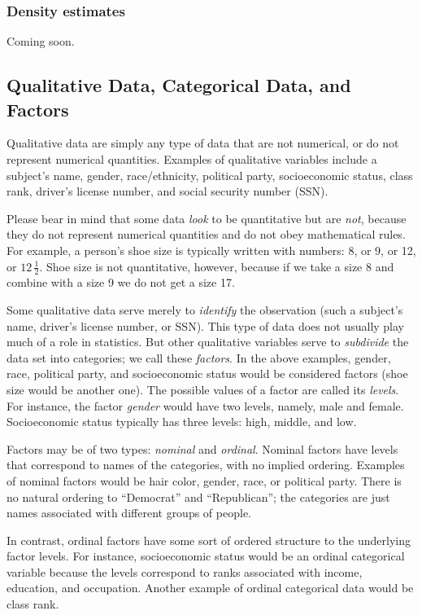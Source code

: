 \documentclass[captions=tableheading]{scrbook}
\begin{document}
\subsubsection{Density estimates}
\label{sec-2-1-2-5}


Coming soon.
\subsection{Qualitative Data, Categorical Data, and Factors}
\label{sec-2-1-3}
\label{sub:Qualitative-Data}


Qualitative data are simply any type of data that are not numerical, or do not represent numerical quantities. Examples of qualitative variables include a subject's name, gender, race/ethnicity, political party, socioeconomic status, class rank, driver's license number, and social security number (SSN).

Please bear in mind that some data \emph{look} to be quantitative but are \emph{not}, because they do not represent numerical quantities and do not obey mathematical rules. For example, a person's shoe size is typically written with numbers: 8, or 9, or 12, or \(12\,\frac{1}{2}\). Shoe size is not quantitative, however, because if we take a size 8 and combine with a size 9 we do not get a size 17.

Some qualitative data serve merely to \emph{identify} the observation (such a subject's name, driver's license number, or SSN). This type of data does not usually play much of a role in statistics. But other qualitative variables serve to \emph{subdivide} the data set into categories; we call these \emph{factors}. In the above examples, gender, race, political party, and socioeconomic status would be considered factors (shoe size would be another one). The possible values of a factor are called its \emph{levels}. For instance, the factor \emph{gender} would have two levels, namely, male and female. Socioeconomic status typically has three levels: high, middle, and low.

Factors may be of two types: \emph{nominal} and \emph{ordinal}. Nominal factors have levels that correspond to names of the categories, with no implied ordering. Examples of nominal factors would be hair color, gender, race, or political party. There is no natural ordering to ``Democrat'' and ``Republican''; the categories are just names associated with different groups of people. 

In contrast, ordinal factors have some sort of ordered structure to the underlying factor levels. For instance, socioeconomic status would be an ordinal categorical variable because the levels correspond to ranks associated with income, education, and occupation. Another example of ordinal categorical data would be class rank.
\end{document}
